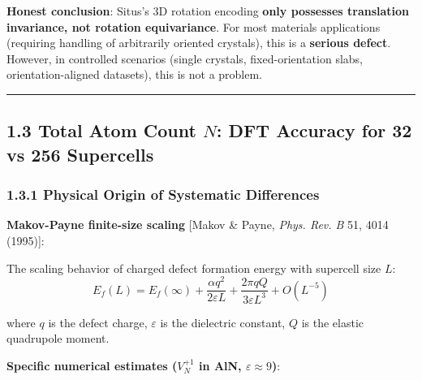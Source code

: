 \documentclass[
  12pt,
]{article}
\begin{document}
\textbf{Honest conclusion}: Situs's 3D rotation encoding \textbf{only possesses translation invariance, not rotation equivariance}. For most materials applications (requiring handling of arbitrarily oriented crystals), this is a \textbf{serious defect}. However, in controlled scenarios (single crystals, fixed-orientation slabs, orientation-aligned datasets), this is not a problem.

\begin{center}\rule{0.5\linewidth}{0.5pt}\end{center}

\subsection{1.3 Total Atom Count $N$: DFT Accuracy for 32 vs 256 Supercells}\label{atom-count-dft-accuracy}

\subsubsection{1.3.1 Physical Origin of Systematic Differences}\label{systematic-differences-physical-origin}

\textbf{Makov-Payne finite-size scaling} [Makov \& Payne, \emph{Phys. Rev. B} 51, 4014 (1995)]:

The scaling behavior of charged defect formation energy with supercell size $L$:
\[E_f(L) = E_f(\infty) + \frac{\alpha q^2}{2\varepsilon L} + \frac{2\pi q Q}{3\varepsilon L^3} + O(L^{-5})\]

where $q$ is the defect charge, $\varepsilon$ is the dielectric constant, $Q$ is the elastic quadrupole moment.

\textbf{Specific numerical estimates ($V_N^{+1}$ in AlN, $\varepsilon \approx 9$)}:
\end{document}
